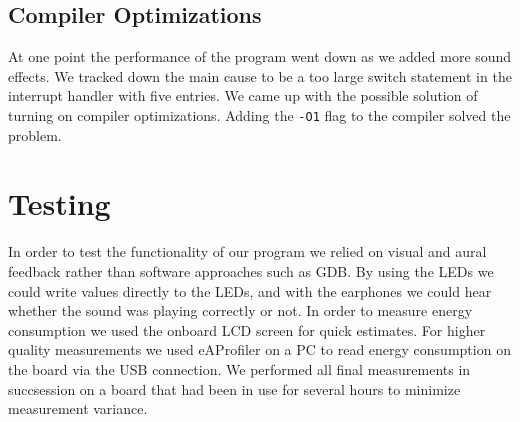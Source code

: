 \subsection{Compiler Optimizations}
At one point the performance of the program went down as we added more sound effects. We tracked down the main cause to be a too large switch statement in the interrupt handler with five entries. We came up with the possible solution of turning on compiler optimizations. Adding the \texttt{-O1} flag to the compiler solved the problem.

\section{Testing}
In order to test the functionality of our program we relied on visual and aural feedback rather than software approaches such as GDB. By using the LEDs we could write values directly to the LEDs, and with the earphones we could hear whether the sound was playing correctly or not. In order to measure energy consumption we used the onboard LCD screen for quick estimates. For higher quality measurements we used eAProfiler on a PC to read energy consumption on the board via the USB connection. We performed all final measurements in succsession on a board that had been in use for several hours to minimize measurement variance. 
